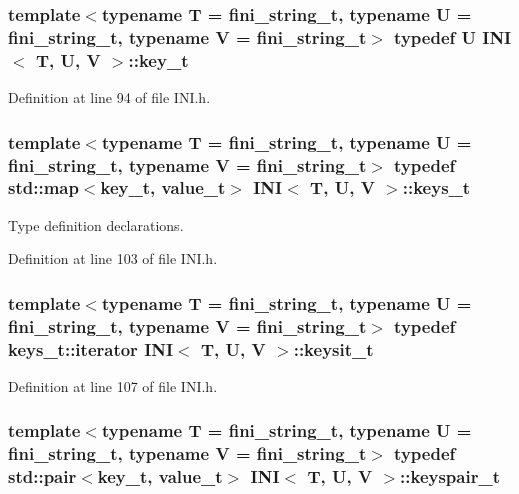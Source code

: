 \subsubsection[{key\+\_\+t}]{\setlength{\rightskip}{0pt plus 5cm}template$<$typename T = fini\+\_\+string\+\_\+t, typename U = fini\+\_\+string\+\_\+t, typename V = fini\+\_\+string\+\_\+t$>$ typedef U {\bf I\+N\+I}$<$ T, U, V $>$\+::{\bf key\+\_\+t}}\label{class_i_n_i_acfa659efbac1eb0c62c1a910b0b09541}


Definition at line 94 of file I\+N\+I.\+h.

\hypertarget{class_i_n_i_a4254e881abdbf891a408cb032e0d717d}{}
\subsubsection[{keys\+\_\+t}]{\setlength{\rightskip}{0pt plus 5cm}template$<$typename T = fini\+\_\+string\+\_\+t, typename U = fini\+\_\+string\+\_\+t, typename V = fini\+\_\+string\+\_\+t$>$ typedef std\+::map$<${\bf key\+\_\+t}, {\bf value\+\_\+t}$>$ {\bf I\+N\+I}$<$ T, U, V $>$\+::{\bf keys\+\_\+t}}\label{class_i_n_i_a4254e881abdbf891a408cb032e0d717d}


Type definition declarations. 



Definition at line 103 of file I\+N\+I.\+h.

\hypertarget{class_i_n_i_ae33c58e217d5ee3fbc8cae737560ce53}{}
\subsubsection[{keysit\+\_\+t}]{\setlength{\rightskip}{0pt plus 5cm}template$<$typename T = fini\+\_\+string\+\_\+t, typename U = fini\+\_\+string\+\_\+t, typename V = fini\+\_\+string\+\_\+t$>$ typedef keys\+\_\+t\+::iterator {\bf I\+N\+I}$<$ T, U, V $>$\+::{\bf keysit\+\_\+t}}\label{class_i_n_i_ae33c58e217d5ee3fbc8cae737560ce53}


Definition at line 107 of file I\+N\+I.\+h.

\hypertarget{class_i_n_i_a74debe5259e76d734b5376c99b0ba1c8}{}
\subsubsection[{keyspair\+\_\+t}]{\setlength{\rightskip}{0pt plus 5cm}template$<$typename T = fini\+\_\+string\+\_\+t, typename U = fini\+\_\+string\+\_\+t, typename V = fini\+\_\+string\+\_\+t$>$ typedef std\+::pair$<${\bf key\+\_\+t}, {\bf value\+\_\+t}$>$ {\bf I\+N\+I}$<$ T, U, V $>$\+::{\bf keyspair\+\_\+t}}\label{class_i_n_i_a74debe5259e76d734b5376c99b0ba1c8}


